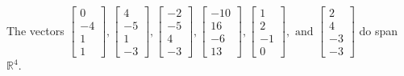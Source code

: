 \begin{exercise}
\begin{exerciseStatement}
  \end{exerciseStatement}
  \begin{exerciseAnswer}
   The vectors \(\left[\begin{array}{r}
0 \\
-4 \\
1 \\
1
\end{array}\right] , \left[\begin{array}{r}
4 \\
-5 \\
1 \\
-3
\end{array}\right] , \left[\begin{array}{r}
-2 \\
-5 \\
4 \\
-3
\end{array}\right] , \left[\begin{array}{r}
-10 \\
16 \\
-6 \\
13
\end{array}\right] , \left[\begin{array}{r}
1 \\
2 \\
-1 \\
0
\end{array}\right] , \text{ and } \left[\begin{array}{r}
2 \\
4 \\
-3 \\
-3
\end{array}\right]\) 
  	 do  
	span \(\mathbb{R}^4\).
  


  \end{exerciseAnswer}
\end{exercise}